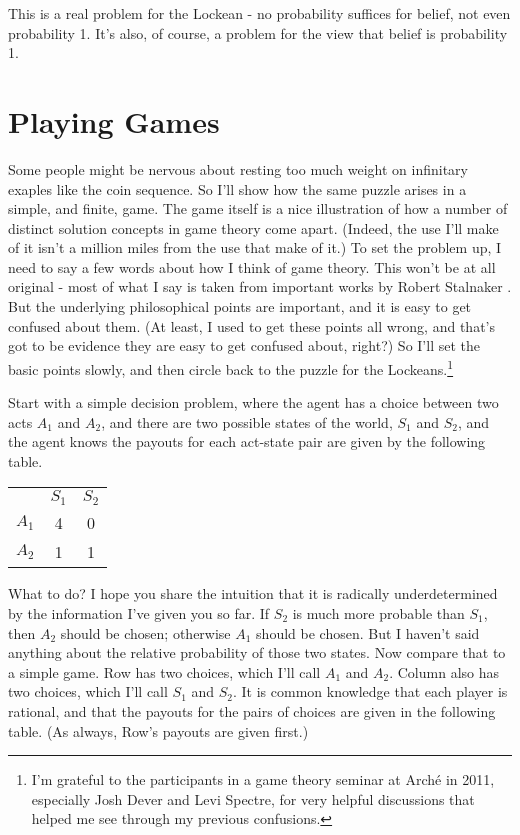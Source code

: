 \documentclass[11pt,]{book}
\let\rmarkdownfootnote\footnote%
\def\footnote{\protect\rmarkdownfootnote}
\def\toprule{}
\def\bottomrule{}
\begin{document}
This is a real problem for the Lockean - no probability suffices for belief, not even probability 1. It's also, of course, a problem for the view that belief is probability 1.

\hypertarget{lockegames}{%
\section{Playing Games}\label{lockegames}}

Some people might be nervous about resting too much weight on infinitary exaples like the coin sequence. So I'll show how the same puzzle arises in a simple, and finite, game. The game itself is a nice illustration of how a number of distinct solution concepts in game theory come apart. (Indeed, the use I'll make of it isn't a million miles from the use that \citet{KohlbergMertens1986} make of it.) To set the problem up, I need to say a few words about how I think of game theory. This won't be at all original - most of what I say is taken from important works by Robert Stalnaker \citetext{\citeyear{Stalnaker1994}; \citeyear{Stalnaker1996}; \citeyear{Stalnaker1998}; \citeyear{Stalnaker1999}}. But the underlying philosophical points are important, and it is easy to get confused about them. (At least, I used to get these points all wrong, and that's got to be evidence they are easy to get confused about, right?) So I'll set the basic points slowly, and then circle back to the puzzle for the Lockeans.\footnote{I'm grateful to the participants in a game theory seminar at Arché in 2011, especially Josh Dever and Levi Spectre, for very helpful discussions that helped me see through my previous confusions.}

Start with a simple decision problem, where the agent has a choice between two acts \(A_1\) and \(A_2\), and there are two possible states of the world, \(S_1\) and \(S_2\), and the agent knows the payouts for each act-state pair are given by the following table.

\begin{longtable}[]{@{}lcc@{}}
\toprule
\endhead
& \(S_1\) & \(S_2\)\tabularnewline
\(A_1\) & 4 & 0\tabularnewline
\(A_2\) & 1 & 1\tabularnewline
\bottomrule
\end{longtable}

What to do? I hope you share the intuition that it is radically underdetermined by the information I've given you so far. If \(S_2\) is much more probable than \(S_1\), then \(A_2\) should be chosen; otherwise \(A_1\) should be chosen. But I haven't said anything about the relative probability of those two states. Now compare that to a simple game. Row has two choices, which I'll call \(A_1\) and \(A_2\). Column also has two choices, which I'll call \(S_1\) and \(S_2\). It is common knowledge that each player is rational, and that the payouts for the pairs of choices are given in the following table. (As always, Row's payouts are given first.)
\end{document}
